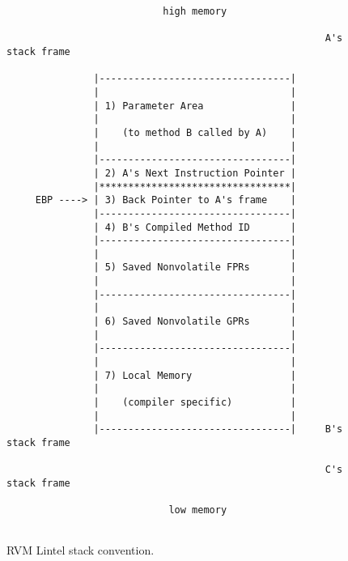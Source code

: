 \begin{figure}
\begin{verbatim}
                           high memory

                                                       A's stack frame

               |---------------------------------|
               |                                 |
               | 1) Parameter Area               |
               |                                 |
               |    (to method B called by A)    |
               |                                 |
               |---------------------------------|
               | 2) A's Next Instruction Pointer |
               |*********************************|
     EBP ----> | 3) Back Pointer to A's frame    |
               |---------------------------------|
               | 4) B's Compiled Method ID       |
               |---------------------------------|
               |                                 |
               | 5) Saved Nonvolatile FPRs       |
               |                                 |
               |---------------------------------|
               |                                 |
               | 6) Saved Nonvolatile GPRs       |
               |                                 |
               |---------------------------------|
               |                                 |
               | 7) Local Memory                 |
               |                                 |
               |    (compiler specific)          |
               |                                 |
               |---------------------------------|     B's stack frame

                                                       C's stack frame

                            low memory


\end{verbatim}
\label{fig:lintel-stackframe}
\caption{RVM Lintel stack convention.}
\end{figure}

